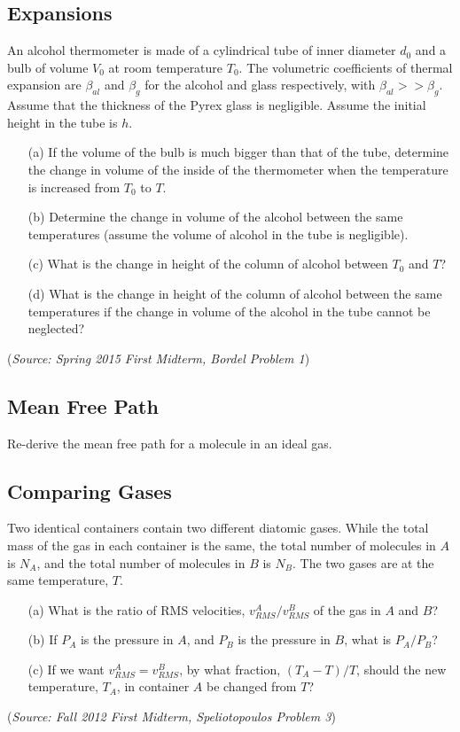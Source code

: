 \documentclass{article}
\begin{document}
\subsection{Expansions}

An alcohol thermometer is made of a cylindrical tube of inner diameter $d_0$ and a bulb of volume $V_0$ at room temperature $T_0$. The volumetric coefficients of thermal expansion are $\beta_{al}$ and $\beta_g$ for the alcohol and glass respectively, with $\beta_{al}>>\beta_g$. Assume that the thickness of the Pyrex glass is negligible. Assume the initial height in the tube is $h$.
\begin{itemize}
	\item[(a)] If the volume of the bulb is much bigger than that of the tube, determine the change in volume of the inside of the thermometer when the temperature is increased from $T_0$ to $T$.
	\item[(b)] Determine the change in volume of the alcohol between the same temperatures (assume the volume of alcohol in the tube is negligible).
	\item[(c)] What is the change in height of the column of alcohol between $T_0$ and $T$?
	\item[(d)] What is the change in height of the column of alcohol between the same temperatures if the change in volume of the alcohol in the tube cannot be neglected?
\end{itemize}
(\textit{Source: Spring 2015 First Midterm, Bordel Problem 1})

\subsection{Mean Free Path}

Re-derive the mean free path for a molecule in an ideal gas.

\subsection{Comparing Gases}

Two identical containers contain two different diatomic gases. While the total mass of the gas in each container is the same, the total number of molecules in $A$ is $N_A$, and the total number of molecules in $B$ is $N_B$. The two gases are at the same temperature, $T$.
\begin{itemize}
	\item[(a)] What is the ratio of RMS velocities, $v_{RMS}^A/v_{RMS}^B$ of the gas in $A$ and $B$?
	\item[(b)] If $P_A$ is the pressure in $A$, and $P_B$ is the pressure in $B$, what is $P_A/P_B$?
	\item[(c)] If we want $v_{RMS}^A = v_{RMS}^B$, by what fraction, $(T_A-T)/T$, should the new temperature, $T_A$, in container $A$ be changed from $T$?
\end{itemize}
(\textit{Source: Fall 2012 First Midterm, Speliotopoulos Problem 3})
\end{document}
